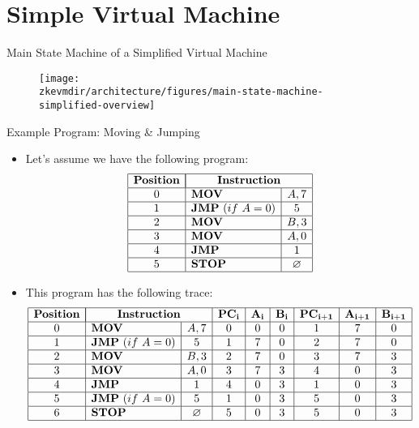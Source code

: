
\section{Simple Virtual Machine}

\begin{frame}{Main State Machine of a Simplified Virtual Machine}
\begin{figure}
	\texttt{[image: \\zkevmdir/architecture/figures/main-state-machine-simplified-overview]}
\end{figure}
\end{frame}









\begin{frame}[allowframebreaks]{Example Program: Moving \& Jumping}
\begin{itemize}
\item Let's assume we have the following program:
\[
\begin{array}{|c|l|c|}
\hline
\mathbf{Position} & \multicolumn{2}{|c|}{\mathbf{Instruction}} \\ \hline
0 & \mathbf{MOV} & A, 7 \\ \hline
1 & \mathbf{JMP}~(if~A = 0) & 5 \\ \hline
2 & \mathbf{MOV} & B, 3 \\ \hline
3 & \mathbf{MOV} & A, 0 \\ \hline
4 & \mathbf{JMP} & 1 \\ \hline
5 & \mathbf{STOP} & \emptyset \\ \hline
\end{array}
\]

\item This program has the following trace:
\[
\begin{array}{|c|l|c|c|c|c|c|c|c|}
\hline
\mathbf{Position} & \multicolumn{2}{|c|}{\mathbf{Instruction}} & \mathbf{PC_i} & \mathbf{A_i} & \mathbf{B_i} & \mathbf{PC_{i+1}} & \mathbf{A_{i+1}} & \mathbf{B_{i+1}} \\ \hline
0 & \mathbf{MOV} & A, 7 & 0 & 0 & 0 & 1 & 7 & 0 \\ \hline
1 & \mathbf{JMP}~(if~A = 0) & 5 & 1 & 7 & 0 & 2 & 7 & 0 \\ \hline
2 & \mathbf{MOV} & B, 3 & 2 & 7 & 0 & 3 & 7 & 3 \\ \hline
3 & \mathbf{MOV} & A, 0 & 3 & 7 & 3 & 4 & 0 & 3 \\ \hline
4 & \mathbf{JMP} & 1 & 4 & 0 & 3 & 1 & 0 & 3 \\ \hline
5 & \mathbf{JMP}~(if~A = 0) & 5 & 1 & 0 & 3 & 5 & 0 & 3 \\ \hline
6 & \mathbf{STOP} & \emptyset & 5 & 0 & 3 & 5 & 0 & 3 \\ \hline
\end{array}
\]
\end{itemize}
\end{frame}






